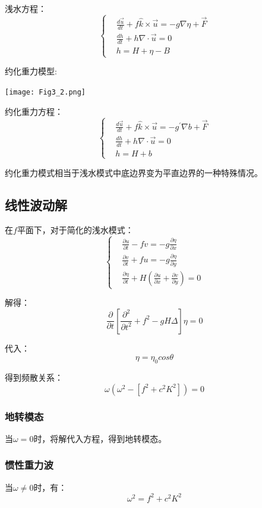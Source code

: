 \documentclass{article}
\begin{document}
浅水方程：
$$\begin{cases}
    &\frac{d\vec{u}}{dt} + f\hat{k}\times\vec{u} = -g\nabla\eta + \vec{F}\\
    &\frac{dh}{dt} + h\nabla\cdot\vec{u} = 0\\
    &h=H+\eta-B
\end{cases}$$

约化重力模型:
\begin{center}
    \texttt{[image: Fig3\_2.png]}
\end{center}

约化重力方程：
$$\begin{cases}
    &\frac{d\vec{u}}{dt} + f\hat{k}\times\vec{u} = -g^{\prime}\nabla b + \vec{F}\\
    &\frac{dh}{dt} + h\nabla\cdot\vec{u} = 0\\
    &h=H+b
\end{cases}$$

约化重力模式相当于浅水模式中底边界变为平直边界的一种特殊情况。

\subsection{线性波动解}
在$f$平面下，对于简化的浅水模式：
$$\begin{cases}
    &\frac{\partial u}{\partial t}-fv=-g\frac{\partial \eta}{\partial x}\\
    &\frac{\partial v}{\partial t}+fu=-g\frac{\partial \eta}{\partial y}\\
    &\frac{\partial \eta}{\partial t}+H(\frac{\partial u}{\partial x}+\frac{\partial v}{\partial y} ) = 0
\end{cases}$$

解得：
$$\frac{\partial }{\partial t}\left[\frac{\partial^2 }{\partial t^2}+f^2-gH\Delta\right]\eta=0 $$

代入：
$$\eta = \eta_0cos\theta$$

得到频散关系：
$$\omega\left(\omega^2-[f^2+c^2K^2]\right)=0$$

\subsubsection{地转模态}
当$\omega=0$时，将解代入方程，得到地转模态。

\subsubsection{惯性重力波}
当$\omega\ne0$时，有：
$$\omega^2 = f^2+c^2K^2$$
\end{document}
